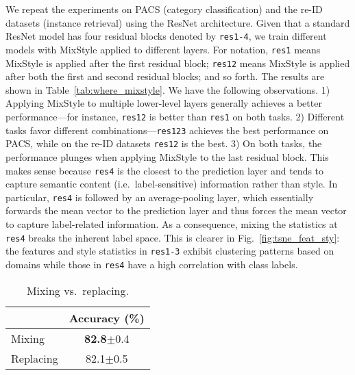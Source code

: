 \documentclass{article} \usepackage{iclr2021_conference,times}
\makeatletter
\renewcommand\paragraph{\@startsection{paragraph}{4}{\z@}{.1em \@plus1ex \@minus.2ex}{-.5em}{\normalfont\normalsize\bfseries}}
\newcommand{\tableCellHeight}{1}
\newcommand{\tabstyle}[1]{
  \setlength{\tabcolsep}{#1}
  \renewcommand{\arraystretch}{\tableCellHeight}
  \centering
}
\makeatother
\begin{document}
\paragraph{Where to apply MixStyle?}
We repeat the experiments on PACS (category classification) and the re-ID datasets (instance retrieval) using the ResNet architecture. Given that a standard ResNet model has four residual blocks denoted by \texttt{res1-4}, we train different models with MixStyle applied to different layers. For notation, \texttt{res1} means MixStyle is applied after the first residual block; \texttt{res12} means MixStyle is applied after both the first and second residual blocks; and so forth. The results are shown in Table~\ref{tab:where_mixstyle}. We have the following observations. 1) Applying MixStyle to multiple lower-level layers generally achieves a better performance---for instance, \texttt{res12} is better than \texttt{res1} on both tasks. 2) Different tasks favor different combinations---\texttt{res123} achieves the best performance on PACS, while on the re-ID datasets \texttt{res12} is the best. 3) On both tasks, the performance plunges when applying MixStyle to the last residual block. This makes sense because \texttt{res4} is the closest to the prediction layer and tends to capture semantic content (i.e.~label-sensitive) information rather than style. In particular, \texttt{res4} is followed by an average-pooling layer, which essentially forwards the mean vector to the prediction layer and thus forces the mean vector to capture label-related information. As a consequence, mixing the statistics at \texttt{res4} breaks the inherent label space. This is clearer in Fig.~\ref{fig:tsne_feat_sty}: the features and style statistics in \texttt{res1-3} exhibit clustering patterns based on domains while those in \texttt{res4} have a high correlation with class labels.
\vspace{1em}

\begin{wraptable}{r}{.3\textwidth}
\vspace{-.5cm}
\tabstyle{5pt}
\caption{Mixing vs.~replacing.}
\label{tab:mix_vs_replace}
\begin{tabular}{lc}
\hline
 & Accuracy (\%) \\
\hline \hline
Mixing & \textbf{82.8}$\pm$0.4 \\
Replacing & 82.1$\pm$0.5 \\
\hline
\end{tabular}
\vspace{-.5cm}
\end{wraptable}
\end{document}
